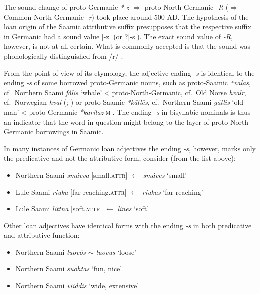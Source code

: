 {\noindent The sound change of proto-Germanic \textit{*-z} $\Rightarrow$ proto-North-Germanic \textit{-R} ($\Rightarrow$ Common North-Germanic \textit{-r}) took place around 500 AD. The hypothesis of the loan origin of the Saamic attributive suffix presupposes that the respective suffix in Germanic had a sound value [-z] (or ?[-s]). The exact sound value of \textit{-R}, however, is not at all certain. What is commonly accepted is that the sound was phonologically distinguished from /r/ \citep{skold1954}.

From the point of view of its etymology, the adjective ending \textit{-s} is identical to the ending \textit{-s} of some borrowed proto-Germanic nouns, such as proto-Saamic \textit{*vālās}, cf.~Northern Saami \textit{fàlis} ‘whale’ < proto-North-Germanic, cf.~Old Norse \textit{hvalr}, cf.~Norwegian \textit{hval} (\citealt[144]{qvigstad1893}; \citealt[144–145]{lehtiranta1989}) or proto-Saamic \textit{*kāllēs}, cf.~Northern Saami \textit{gállis} ‘old man’ < proto-Germanic \textit{*karilaz} \textsc{m} \cite[44–45]{lehtiranta1989}. The ending \textit{-s} in bisyllabic nominals is thus an indicator that the word in question might belong to the layer of proto-North-Germanic borrowings in Saamic.

In many instances of Germanic loan adjectives the ending \textit{-s}, however, marks only the predicative and not the attributive form, consider (from the list above):

\begin{itemize}
\item Northern Saami \textit{smávva} [small.\textsc{attr}] $\leftarrow$ \textit{smáves} ‘small’
\item Lule Saami \textit{riuka} [far-reaching.\textsc{attr}] $\leftarrow$ \textit{riukas} ‘far-reaching’
\item Lule Saami \textit{littna} [soft.\textsc{attr}] $\leftarrow$ \textit{lines} ‘soft’
\end{itemize}

\noindent Other loan adjectives have identical forms with the ending \textit{-s} in both predicative and attributive function:

\begin{itemize}
\item Northern Saami \textit{luov\.{o}s $\sim$ luovus} ‘loose'
\item Northern Saami \textit{suohtas} ‘fun, nice'
\item Northern Saami \textit{viiddis} ‘wide, extensive'
\end {itemize}

}

